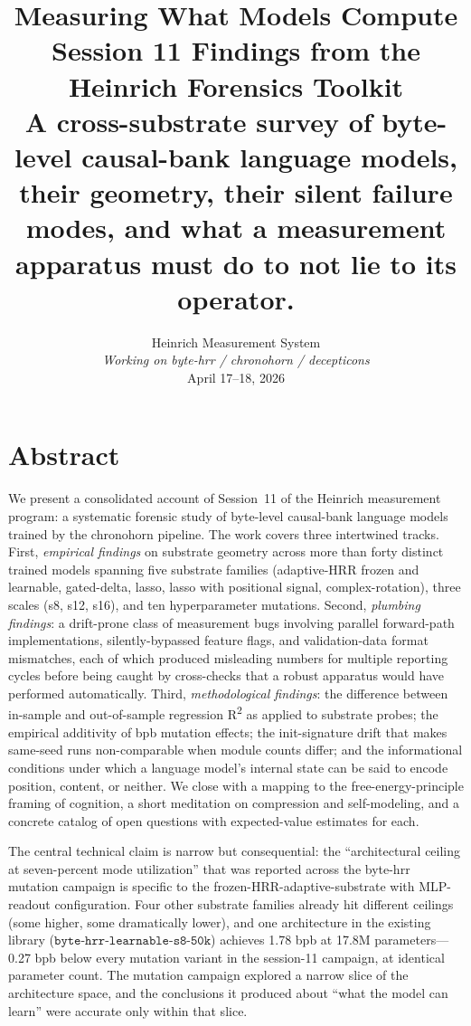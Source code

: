 \documentclass[11pt,openany]{book}
\title{\vspace{-2em}
  Measuring What Models Compute\\
  \vspace{0.3em}
  \large{Session 11 Findings from the Heinrich Forensics Toolkit}\\
  \vspace{0.2em}
  \normalsize{A cross-substrate survey of byte-level causal-bank language models,\\
             their geometry, their silent failure modes, and what a measurement\\
             apparatus must do to not lie to its operator.}
}
\author{Heinrich Measurement System\\
\textit{Working on byte-hrr / chronohorn / decepticons}\\
April 17--18, 2026}
\date{}
\begin{document}
\frontmatter
\maketitle

\chapter*{Abstract}

We present a consolidated account of Session~11 of the Heinrich
measurement program: a systematic forensic study of byte-level
causal-bank language models trained by the chronohorn pipeline. The
work covers three intertwined tracks. First, \emph{empirical findings}
on substrate geometry across more than forty distinct trained models
spanning five substrate families (adaptive-HRR frozen and learnable,
gated-delta, lasso, lasso with positional signal, complex-rotation),
three scales (s8, s12, s16), and ten hyperparameter mutations. Second,
\emph{plumbing findings}: a drift-prone class of measurement bugs
involving parallel forward-path implementations, silently-bypassed
feature flags, and validation-data format mismatches, each of which
produced misleading numbers for multiple reporting cycles before being
caught by cross-checks that a robust apparatus would have performed
automatically. Third, \emph{methodological findings}: the difference
between in-sample and out-of-sample regression R\textsuperscript{2} as applied to substrate
probes; the empirical additivity of bpb mutation effects; the
init-signature drift that makes same-seed runs non-comparable when
module counts differ; and the informational conditions under which a
language model's internal state can be said to encode position, content,
or neither. We close with a mapping to the free-energy-principle framing
of cognition, a short meditation on compression and self-modeling, and
a concrete catalog of open questions with expected-value estimates for
each.

The central technical claim is narrow but consequential: the
``architectural ceiling at seven-percent mode utilization'' that was
reported across the byte-hrr mutation campaign is specific to the
frozen-HRR-adaptive-substrate with MLP-readout configuration. Four
other substrate families already hit different ceilings (some higher,
some dramatically lower), and one architecture in the existing library
($\texttt{byte-hrr-learnable-s8-50k}$) achieves 1.78 bpb at 17.8M
parameters---0.27 bpb below every mutation variant in the session-11
campaign, at identical parameter count. The mutation campaign explored
a narrow slice of the architecture space, and the conclusions it
produced about ``what the model can learn'' were accurate only within
that slice.
\end{document}
